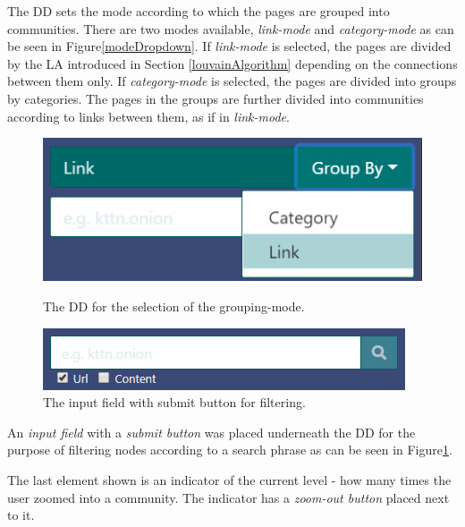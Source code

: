 The DD sets the mode according to which the pages are grouped into communities. There are two modes available, \textit{link-mode} and \textit{category-mode} as can be seen in Figure\ref{modeDropdown}. If \textit{link-mode} is selected, the pages are divided by the LA introduced in Section \ref{louvainAlgorithm} depending on the connections between them only. If \textit{category-mode} is selected, the pages are divided into groups by categories. The pages in the groups are further divided into communities according to links between them, as if in \textit{link-mode}. 
\begin{figure} 
  \begin{minipage}[t]{0.475\textwidth}
    \centering
    \includegraphics[width=\textwidth]{Images/mode_dropdown.png}
    \caption{The DD for the selection of the grouping-mode.}
    \label{modeDropdown}
  \end{minipage} \hfill
  \begin{minipage}[t]{0.475\textwidth}
    \centering
    \includegraphics[width=\textwidth]{Images/filter.png}
    \caption{The input field with submit button for filtering.}
    \label{filterNodesElement}
  \end{minipage}   
\end{figure}   

 An \textit{input field} with a \textit{submit button} was placed underneath the DD for the purpose of filtering nodes according to a search phrase as can be seen in Figure\ref{filterNodesElement}.

The last element shown is an indicator of the current level - how many times the user zoomed into a community. The indicator has a \textit{zoom-out button} placed next to it.

